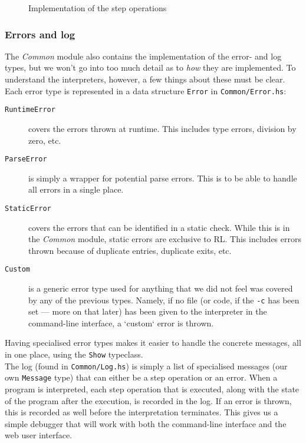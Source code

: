 \begin{figure}[H]
  
  \caption{Implementation of the step operations}\label{fig:step}
\end{figure}

\subsubsection{Errors and log}
The \textit{Common} module also contains the implementation of the error- and log types, but we won't go into too much detail as to \textit{how} they are implemented. To understand the interpreters, however, a few things about these must be clear.\\

\noindent Each error type is represented in a data structure \texttt{Error} in \texttt{Common/Error.hs}:
\begin{description}
  \item[\texttt{RuntimeError}] covers the errors thrown at runtime. This includes type errors, division by zero, etc.
  \item[\texttt{ParseError}] is simply a wrapper for potential parse errors. This is to be able to handle all errors in a single place.
  \item[\texttt{StaticError}] covers the errors that can be identified in a static check. While this is in the \textit{Common} module, static errors are exclusive to RL. This includes errors thrown because of duplicate entries, duplicate exits, etc.
  \item[\texttt{Custom}] is a generic error type used for anything that we did not feel was covered by any of the previous types. Namely, if no file (or code, if the \texttt{-c} has been set --- more on that later) has been given to the interpreter in the command-line interface, a `custom` error is thrown.
\end{description}

\noindent Having specialised error types makes it easier to handle the concrete messages, all in one place, using the \texttt{Show} typeclass.\\

\noindent The log (found in \texttt{Common/Log.hs}) is simply a list of specialised messages (our own \texttt{Message} type) that can either be a step operation or an error. When a program is interpreted, each step operation that is executed, along with the state of the program after the execution, is recorded in the log. If an error is thrown, this is recorded as well before the interpretation terminates. This gives us a simple debugger that will work with both the command-line interface and the web user interface.

